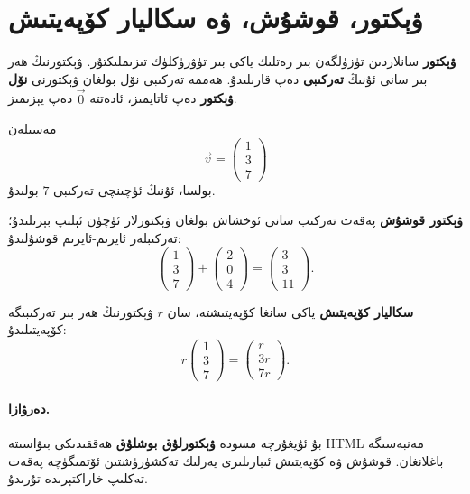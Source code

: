 \documentclass[12pt]{article}
\renewcommand{\emph}[1]{\textbf{#1}}
\begin{document}
\section*{ۋېكتور، قوشۇش، ۋە سكاليار كۆپەيتىش}

\emph{ۋېكتور} سانلاردىن تۈزۈلگەن بىر رەتلىك ياكى بىر تۈۋرۈكلۈك تىزىملىكتۇر. ۋېكتورنىڭ ھەر بىر سانى ئۇنىڭ \emph{تەركىبى} دەپ قارىلىدۇ. ھەممە تەركىبى نۆل بولغان ۋېكتورنى \emph{نۆل ۋېكتور} دەپ ئاتايمىز، ئادەتتە \(\vec{0}\) دەپ يېزىمىز.

مەسىلەن
\[
  \vec{v}=\begin{pmatrix}1\\3\\7\end{pmatrix}
\]
بولسا، ئۇنىڭ ئۈچىنچى تەركىبى \(7\) بولىدۇ.

\emph{ۋېكتور قوشۇش} پەقەت تەركىب سانى ئوخشاش بولغان ۋېكتورلار ئۈچۈن ئېلىپ بېرىلىدۇ؛ تەركىبلەر ئايرىم-ئايرىم قوشۇلىدۇ:
\[
  \begin{pmatrix}1\\3\\7\end{pmatrix}+
  \begin{pmatrix}2\\0\\4\end{pmatrix}
  =
  \begin{pmatrix}3\\3\\11\end{pmatrix}.
\]

\emph{سكاليار كۆپەيتىش} ياكى سانغا كۆپەيتىشتە، سان \(r\) ۋېكتورنىڭ ھەر بىر تەركىبىگە كۆپەيتىلىدۇ:
\[
  r\begin{pmatrix}1\\3\\7\end{pmatrix}
  =
  \begin{pmatrix}r\\3r\\7r\end{pmatrix}.
\]

\paragraph{دەرۋازا.} بۇ ئۇيغۇرچە مسودە \emph{ۋېكتورلۇق بوشلۇق} ھەققىدىكى بىۋاسىتە HTML مەنبەسىگە باغلانغان. قوشۇش ۋە كۆپەيتىش ئىبارىلىرى يەرلىك تەكشۈرۈشتىن ئۆتمىگۈچە پەقەت تەكلىپ خاراكتېرىدە تۇرىدۇ.
\end{document}
